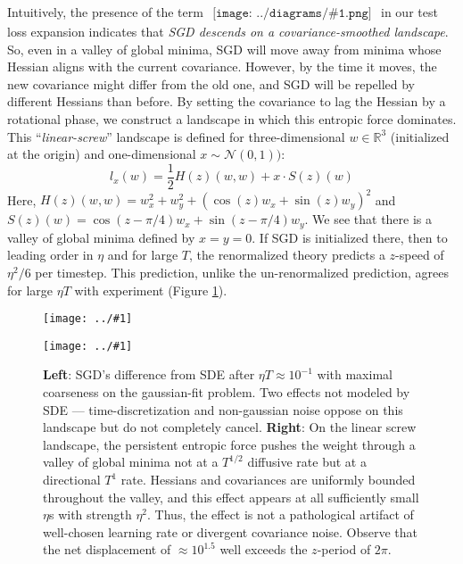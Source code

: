 \documentclass{article}
\theoremstyle{plain}
\theoremstyle{definition}
\newcommand{\Nn}{\mathcal{N}}
\newcommand{\RR}{\mathbb{R}}
\newcommand{\plotmoo}[3]{
    \texttt{[image: ../\#1]}
}
\newcommand{\sdia}[1]{\begin{gathered}\texttt{[image: ../diagrams/\#1.png]}\end{gathered}}
\begin{document}
        Intuitively, the presence of the term
        $
            \sdia{c(01-2-3)(02-12-23)}
        $
        in our test loss expansion indicates that 
        \emph{SGD descends on a covariance-smoothed landscape}.
        So, even in a valley of global minima, SGD will move away from minima
        whose Hessian aligns with the current covariance.  However, by the time
        it moves, the new covariance might differ from the old one, and SGD will
        be repelled by different Hessians than before.  By setting the
        covariance to lag the Hessian by a rotational phase, we construct
        a landscape in which this entropic force dominates.
        This ``\emph{linear-screw}'' landscape is defined for
        three-dimensional $w\in \RR^3$ (initialized at the origin) and
        one-dimensional $x \sim \Nn(0, 1))$:
        $$
            l_x(w) = \frac{1}{2} H(z)(w, w) + x \cdot S(z)(w)  
        $$
        Here, $H(z)(w, w) = w_x^2 + w_y^2 + (\cos(z) w_x + \sin(z) w_y)^2$
        and   $S(z)(w)    = \cos(z-\pi/4) w_x + \sin(z-\pi/4) w_y$.
        We see that there is a valley of global minima defined by $x=y=0$. 
        If SGD is initialized there, then to leading order in $\eta$ and for
        large $T$, the renormalized theory predicts a $z$-speed of $\eta^2/6$ 
        per timestep.  This prediction, unlike the
        un-renormalized prediction, agrees for large $\eta T$
        with experiment (Figure \ref{fig:thermo}).

        \begin{figure}[h!]
            \centering
            \plotmoo{plots/vs-sde}{0.48\columnwidth}{4.0cm}
            \plotmoo{plots/thermo-linear-screw}{0.48\columnwidth}{4.0cm}
            \caption{
                {\bf Left}: SGD's difference from SDE after $\eta T \approx
                10^{-1}$ with maximal coarseness on the gaussian-fit problem.  
                Two effects not modeled by SDE --- time-discretization and
                non-gaussian noise oppose on this landscape but do not
                completely cancel. 
                {\bf Right}: On the linear screw landscape, the persistent
                entropic force pushes the weight through a valley of global
                minima not at a $T^{1/2}$ diffusive rate but at a directional
                $T^1$ rate.  Hessians and covariances  are uniformly bounded
                throughout the valley, and this effect appears at all
                sufficiently small $\eta$s with strength $\eta^2$.  Thus, the
                effect is not a pathological artifact of well-chosen learning
                rate or divergent covariance noise.  Observe that the net
                displacement of $\approx 10^{1.5}$ well exceeds the $z$-period
                of $2\pi$. 
            }
            \label{fig:thermo}
        \end{figure}
\end{document}
